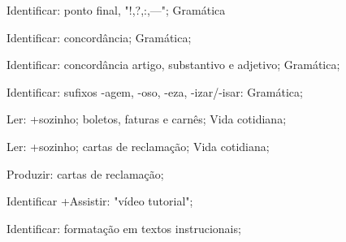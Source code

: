  Identificar: ponto final, "!,?,:,—"; Gramática

 Identificar: concordância; Gramática;

 Identificar: concordância artigo, substantivo e adjetivo; Gramática;

 Identificar: sufixos -agem, -oso, -eza, -izar/-isar: Gramática;

 Ler: +sozinho; boletos, faturas e carnês; Vida cotidiana;

 Ler: +sozinho; cartas de reclamação; Vida cotidiana; 

 Produzir: cartas de reclamação;

 Identificar +Assistir: "vídeo tutorial"; 

 Identificar: formatação em textos instrucionais; 

